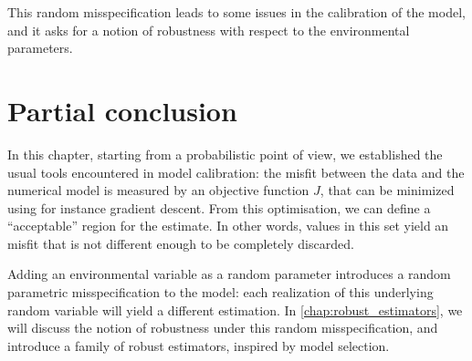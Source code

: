 \documentclass[../../Main_ManuscritThese.tex]{subfiles}
\begin{document}
This random misspecification leads to some issues in the calibration
of the model, and it asks for a notion of robustness with respect to
the environmental parameters.

\section{Partial conclusion}
\label{sec:chap2_partial}

In this chapter, starting from a probabilistic point of view, we
established the usual tools encountered in model calibration: the
misfit between the data and the numerical model is measured by an
objective function $J$, that can be minimized using for instance
gradient descent. From this optimisation, we can define a
``acceptable'' region for the estimate. In other words, values in this
set yield an misfit that is not different enough to be completely
discarded.

Adding an environmental variable as a random parameter introduces a
random parametric misspecification to the model: each realization of
this underlying random variable will yield a different estimation. In
\cref{chap:robust_estimators}, we will discuss the notion of
robustness under this random misspecification, and introduce a family
of robust estimators, inspired by model selection.

\markchapterend


\subfileLocal{
	\pagestyle{empty}
	
	
}
\end{document}
